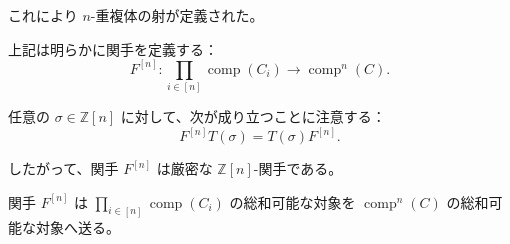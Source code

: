 これにより $n$-重複体の射が定義された。

上記は明らかに関手を定義する：
\begin{equation}
  F^{[n]}\colon
  \prod_{i\in[n]}\operatorname{comp}(C_i)
  \longrightarrow \operatorname{comp}^{n}(C).
  \tag{2.4.2.4}
\end{equation}

任意の $\sigma\in\mathbb Z[n]$ に対して、次が成り立つことに注意する：
\begin{equation}
  F^{[n]}T(\sigma)=T(\sigma)F^{[n]}.
  \tag{2.4.2.5}
\end{equation}

したがって、関手 $F^{[n]}$ は厳密な $\mathbb Z[n]$-関手である。

関手 $F^{[n]}$ は
$\prod_{i\in[n]}\operatorname{comp}(C_i)$ の総和可能な対象を
$\operatorname{comp}^{n}(C)$ の総和可能な対象へ送る。
